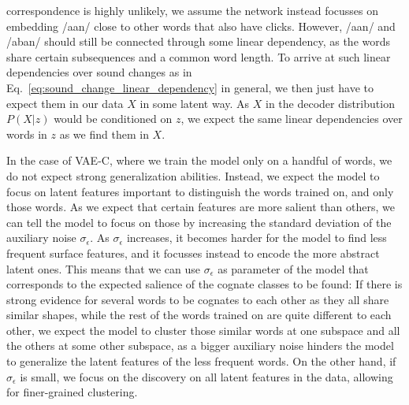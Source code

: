 \documentclass[6pt]{article}
\begin{document}
correspondence is highly unlikely, we assume the network instead focusses on embedding /a\textipa{\textdoublebarpipe}an/ close to other words that also have clicks. However, /a\textipa{\textdoublebarpipe}an/ and /aban/ should still be connected through some linear dependency, as the words share certain subsequences and a common word length. To arrive at such linear dependencies over sound changes as in Eq.~\ref{eq:sound_change_linear_dependency} in general, we then just have to expect them in our data $X$ in some latent way. As $X$ in the decoder distribution $P(X|z)$ would be conditioned on $z$, we expect the same linear dependencies over words in $z$ as we find them in $X$.


In the case of VAE-C, where we train the model only on a handful of words, we do not expect strong generalization abilities. Instead, we expect the model to focus on latent features important to distinguish the words trained on, and only those words. %
As we expect that certain features are more salient than others, we can tell the model to focus on those by increasing the standard deviation of the auxiliary noise $\sigma_{\epsilon}$. As $\sigma_{\epsilon}$ increases, it becomes harder for the model to find less frequent surface features, and it focusses instead to encode the more abstract latent ones. This means that we can use $\sigma_{\epsilon}$ as parameter of the model that corresponds to the expected salience of the cognate classes to be found: If there is strong evidence for several words to be cognates to each other as they all share similar shapes, while the rest of the words trained on are quite different to each other, we expect the model to cluster those similar words at one subspace and all the others at some other subspace, as a bigger auxiliary noise hinders the model to generalize the latent features of the less frequent words. On the other hand, if  $\sigma_{\epsilon}$  is small, we focus on the discovery on all latent features in the data, allowing for finer-grained clustering.  
\end{document}
